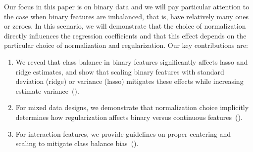 Our focus in this paper is on binary data and we will pay particular attention to the case
when binary features are imbalanced, that is, have relatively many ones or zeroes. In this
scenario, we will demonstrate that the choice of normalization directly influences the
regression coefficients and that this effect depends on the particular choice of
normalization and regularization. Our key contributions are:
\begin{enumerate}
  \item We reveal that class balance in binary features significantly affects lasso and ridge
        estimates, and show that scaling binary features with standard deviation (ridge) or
        variance (lasso) mitigates these effects while increasing estimate
        variance~().
  \item For mixed data designs, we demonstrate that normalization choice implicitly determines how
        regularization affects binary versus continuous features~().
  \item For interaction features, we provide guidelines on proper centering and scaling to mitigate
        class balance bias~().
\end{enumerate}
